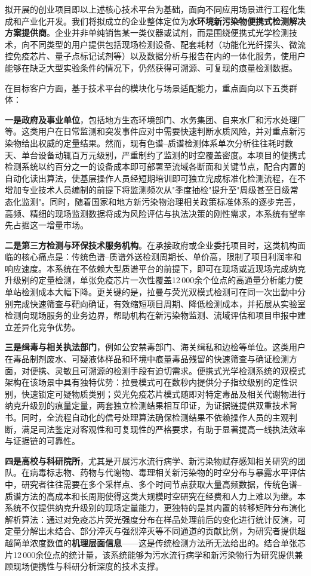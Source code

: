 \documentclass[12pt,a4paper]{article}
\begin{document}
拟开展的创业项目即以上述核心技术平台为基础，面向不同应用场景进行工程化集成和产业化开发。我们将拟成立的企业整体定位为\textbf{水环境新污染物便携式检测解决方案提供商}。企业并非单纯销售某一类仪器或试剂，而是围绕便携式光学检测技术，向不同类型的用户提供包括现场检测设备、配套耗材（功能化光纤探头、微流控免疫芯片、量子点标记试剂等）以及数据分析与报告在内的一体化服务，使用户能够在缺乏大型实验条件的情况下，仍然获得可溯源、可复现的痕量检测数据。

在目标客户方面，基于技术平台的模块化与场景适配能力，重点面向以下五类群体：

\textbf{一是政府及事业单位}，包括地方生态环境部门、水务集团、自来水厂和污水处理厂等。这类用户在日常监测和突发事件应对中需要快速判断水质风险，并对重点新污染物给出权威的定量结果。然而，现有色谱--质谱检测体系单次分析往往耗时数天、单台设备动辄百万元级别，严重制约了监测的时空覆盖密度。本项目的便携式检测系统以约百分之一的设备成本即可部署至流域各断面和关键节点，配合内置的自动化读出算法，使基层操作人员经短期培训即可独立完成标准化检测流程，在不增加专业技术人员编制的前提下将监测频次从"季度抽检"提升至"周级甚至日级常态化监测"。同时，随着国家和地方新污染物治理相关政策标准体系的逐步完善，高频、精细的现场监测数据将成为风险评估与执法决策的刚性需求，本系统有望率先占据这一增量市场。

\textbf{二是第三方检测与环保技术服务机构}。在承接政府或企业委托项目时，这类机构面临的核心痛点是：传统色谱--质谱外送检测周期长、单价高，限制了项目利润率和响应速度。本系统在不依赖大型质谱平台的前提下，即可在现场或近现场完成纳克升级别的定量检测，单张免疫芯片一次性覆盖12\,000余个位点的高通量分析能力使单站检测成本大幅下降。更关键的是，拉曼与荧光双模式检测可在同一次出勤中分别完成快速筛查与靶向确证，有效缩短项目周期、降低检测成本，并拓展从实验室检测向现场服务的业务边界，帮助机构在新污染物监测、流域评估和项目申报中建立差异化竞争优势。

\textbf{三是缉毒与相关执法部门}，例如公安禁毒部门、海关缉私和边检等单位。这类用户在毒品制剂废水、可疑液体样品和环境中痕量毒品残留的快速筛查与确证检测方面，对便携、灵敏且可溯源的检测手段有迫切需求。便携式光学检测系统的双模式架构在该场景中具有独特优势：拉曼模式可在数秒内提供分子指纹级别的定性识别，快速锁定可疑物质类别；荧光免疫芯片模式随即对特定毒品及相关代谢物进行纳克升级别的痕量定量，两套独立检测结果相互印证，为证据链提供双重技术背书。同时，全流程自动化的信号处理算法确保检测结果不依赖操作人员的主观判断，满足司法鉴定对客观性和可复现性的严格要求，有助于显著提高一线执法效率与证据链的可靠性。

\textbf{四是高校与科研院所}，尤其是开展污水流行病学、新污染物赋存感知相关研究的团队。在病毒标志物、药物与代谢物、毒理相关新污染物的时空分布与暴露水平评估中，研究者往往需要在多个采样点、多个时间节点获取大量高频数据，传统色谱--质谱方法的高成本和长周期使得这类大规模时空研究在经费和人力上难以为继。本系统不仅提供纳克升级别的现场定量能力，更独特的是其内置的转移矩阵分布演化解析算法：通过对免疫芯片荧光强度分布在样品处理前后的变化进行统计反演，可定量分解出未结合、部分淬灭与强烈淬灭等不同通道的贡献比例，为研究者提供超越简单浓度数值的\textbf{机理层面信息}——这是传统检测方法所无法给出的。结合单张芯片12\,000余位点的统计量，该系统能够为污水流行病学和新污染物行为研究提供兼顾现场便携性与科研分析深度的技术支撑。
\end{document}
